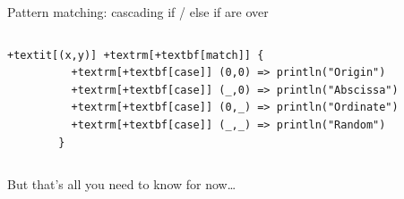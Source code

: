 \begin{frame}[fragile]{Pattern matching: cascading if / else if are over}
 \begin{columns}
    \begin{column}{.73\linewidth}
      \begin{Verbatim}[gobble=8,fontsize=\footnotesize,frame=single,commandchars=+[\]]
        +textit[(x,y)] +textrm[+textbf[match]] {
          +textrm[+textbf[case]] (0,0) => println("Origin")
          +textrm[+textbf[case]] (_,0) => println("Abscissa")
          +textrm[+textbf[case]] (0,_) => println("Ordinate")
          +textrm[+textbf[case]] (_,_) => println("Random")
        }
      \end{Verbatim}      
    \end{column}
    \begin{column}{.265\linewidth}
      ~
    \end{column}
  \end{columns}
\end{frame}
\begin{frame}

  \medskip

  \centerline{But that's all you need to know for now\ldots}
\end{frame}

